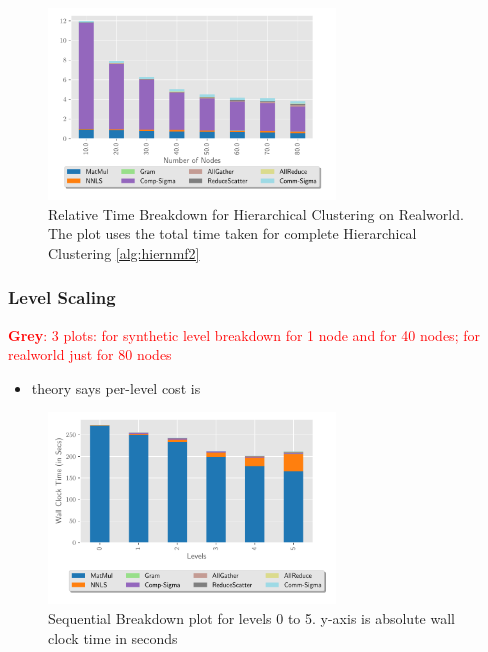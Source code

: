 \documentclass[conference,compsoc]{IEEEtran}
\newcommand{\GB}[1]{\textcolor{red}{\textbf{Grey}: #1}}
\begin{document}
\begin{figure}
\begin{center}
\includegraphics[height=2in, width=\columnwidth]{plots/realworld_hier_strongscaling.pdf}
\caption{Relative Time Breakdown for Hierarchical Clustering on Realworld. The plot uses the total time taken for complete Hierarchical Clustering \cref{alg:hiernmf2}}
\label{fig:rwhierstrongscaling}
\end{center}
\end{figure}

\subsubsection{Level Scaling}

\GB{3 plots: for synthetic level breakdown for 1 node and for 40 nodes; for realworld just for 80 nodes}

\begin{itemize}
	\item theory says per-level cost is 
\end{itemize}

\begin{figure}
\begin{center}
\includegraphics[height=2in, width=\columnwidth]{plots/synthetic_sequential_level_breakdown.pdf}
\caption{Sequential Breakdown plot for levels 0 to 5. y-axis is absolute wall clock time in seconds}
\label{fig:seqlevelbreakdown}
\end{center}
\end{figure}
\end{document}
